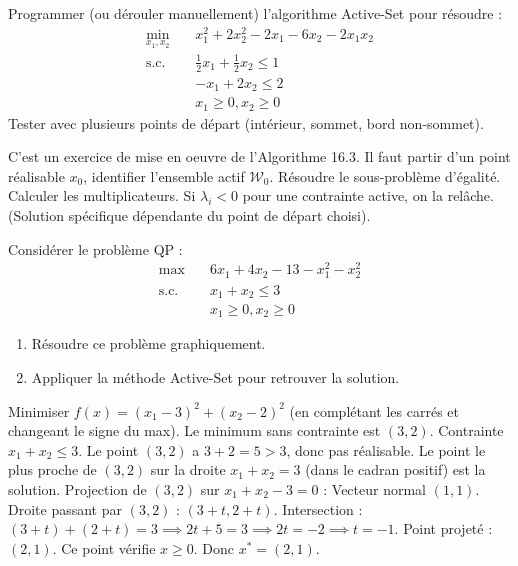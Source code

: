 \bigskip
\begin{exercice}
Programmer (ou dérouler manuellement) l'algorithme Active-Set pour résoudre :
\begin{align*}
    \min_{x_1, x_2} \quad & x_1^2 + 2x_2^2 - 2x_1 - 6x_2 - 2x_1 x_2 \\
    \text{s.c. } \quad & \frac{1}{2}x_1 + \frac{1}{2}x_2 \le 1 \\
               & -x_1 + 2x_2 \le 2 \\
               & x_1 \ge 0, x_2 \ge 0
\end{align*}
Tester avec plusieurs points de départ (intérieur, sommet, bord non-sommet).
\end{exercice}

\begin{correction}
C'est un exercice de mise en oeuvre de l'Algorithme 16.3.
Il faut partir d'un point réalisable $x_0$, identifier l'ensemble actif $\mathcal{W}_0$.
Résoudre le sous-problème d'égalité. Calculer les multiplicateurs. Si $\lambda_i < 0$ pour une contrainte active, on la relâche.
(Solution spécifique dépendante du point de départ choisi).
\end{correction}
\bigskip

\bigskip
\begin{exercice}
Considérer le problème QP :
\begin{align*}
    \max \quad & 6x_1 + 4x_2 - 13 - x_1^2 - x_2^2 \\
    \text{s.c. } \quad & x_1 + x_2 \le 3 \\
               & x_1 \ge 0, x_2 \ge 0
\end{align*}
\begin{enumerate}
    \item Résoudre ce problème graphiquement.
    \item Appliquer la méthode Active-Set pour retrouver la solution.
\end{enumerate}
\end{exercice}

\begin{correction}
Minimiser $f(x) = (x_1 - 3)^2 + (x_2 - 2)^2$ (en complétant les carrés et changeant le signe du max).
Le minimum sans contrainte est $(3, 2)$.
Contrainte $x_1 + x_2 \le 3$. Le point $(3,2)$ a $3+2=5 > 3$, donc pas réalisable.
Le point le plus proche de $(3,2)$ sur la droite $x_1+x_2=3$ (dans le cadran positif) est la solution.
Projection de $(3,2)$ sur $x_1+x_2-3=0$ :
Vecteur normal $(1,1)$. Droite passant par $(3,2)$ : $(3+t, 2+t)$.
Intersection : $(3+t) + (2+t) = 3 \implies 2t + 5 = 3 \implies 2t = -2 \implies t=-1$.
Point projeté : $(2, 1)$.
Ce point vérifie $x \ge 0$. Donc $x^*=(2,1)$.
\end{correction}
\bigskip

